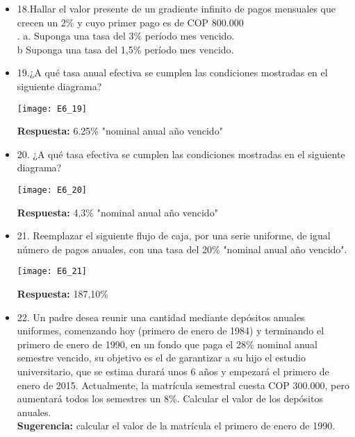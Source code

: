 \begin{itemize}
 \item 18.Hallar el valor presente de un gradiente infinito de pagos mensuales que crecen un 2\% y cuyo primer pago es de COP 800.000\\.
       a. Suponga una tasa del 3\% período mes vencido.\\
       b Suponga una tasa del 1,5\% período mes vencido.\\
       \medskip

 \item 19.¿A qué tasa anual efectiva se cumplen las condiciones mostradas en el siguiente diagrama?\\
       \begin{center}
        \texttt{[image: E6\_19]}
       \end{center}
       \textbf{Respuesta:} 6.25\% "nominal anual año vencido"\\
       \medskip

 \item 20. ¿A qué tasa efectiva se cumplen las condiciones mostradas en el siguiente diagrama?\\
       \begin{center}
        \texttt{[image: E6\_20]}
       \end{center}
       \textbf{Respuesta:} 4,3\% "nominal anual año vencido"\\
       \medskip

 \item 21. Reemplazar el siguiente flujo de caja, por una serie uniforme, de igual número de pagos anuales, con una tasa del 20\% "nominal anual año vencido".\\
       \begin{center}
        \texttt{[image: E6\_21]}
       \end{center}
       \textbf{Respuesta:} 187,10\%\\
       \medskip

 \item 22. Un padre desea reunir una cantidad mediante depósitos anuales uniformes, comenzando hoy (primero de enero de 1984) y terminando el primero de enero de 1990, en un fondo que paga el 28\% nominal anual semestre vencido, su objetivo es el de garantizar a su hijo el estudio universitario, que se estima durará unos 6 años y empezará el primero de enero de 2015. Actualmente, la matrícula semestral cuesta COP 300.000, pero aumentará todos los semestres un 8\%. Calcular el valor de los depósitos anuales.\\
       \textbf{Sugerencia:} calcular el valor de la matrícula el primero de enero de 1990.\\
       \medskip


\end{itemize}
